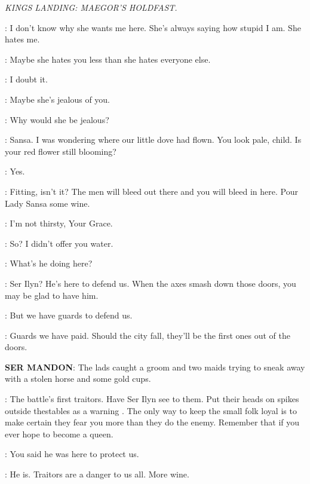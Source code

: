 \scene

\textit{KINGS LANDING: MAEGOR'S HOLDFAST.}


\SANSA: I don't know why she wants me here. She's always saying how stupid I am. She hates me. 

\SHAE: Maybe she hates you less than she hates everyone else. 

\SANSA: I doubt it. 

\SHAE: Maybe she's jealous of you. 

\SANSA: Why would she be jealous? 

\CERSEI: Sansa. I was wondering where our little dove had flown. You look pale, child. Is your red flower still blooming? 

\SANSA: Yes. 

\CERSEI: Fitting, isn't it? The men will bleed out there and you will bleed in here.  Pour Lady Sansa some wine. 


\SANSA: I'm not thirsty, Your Grace. 

\CERSEI: So? I didn't offer you water. 

\SANSA:  What's he doing here? 

\CERSEI: Ser Ilyn? He's here to defend us. When the axes smash down those doors, you may be glad to have him. 

\SANSA: But we have guards to defend us. 

\CERSEI: Guards we have paid. Should the city fall, they'll be the first ones out of the doors. 


\textbf{SER MANDON}: The lads caught a groom and two maids trying to sneak away with a stolen horse and some gold cups. 

\CERSEI: The battle's first traitors. Have Ser Ilyn see to them.  Put their heads on spikes outside thestables as a warning . The only way to keep the small folk loyal is to make certain they fear you more than they do the enemy.  Remember that if you ever hope to
become a queen.

\SANSA: You said he was here to protect us. 

\CERSEI: He is. Traitors are a danger to us all. More wine. 


